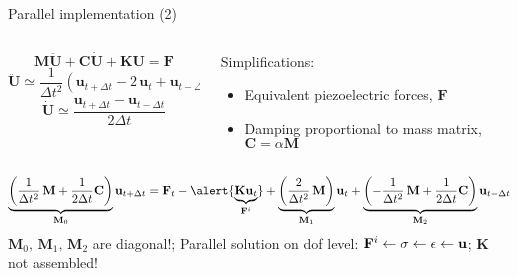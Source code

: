 \documentclass[10pt,aspectratio=169,dvipsnames]{beamer} %
\newcommand{\matr}[1]{\mathbf{#1}} %
\newcommand{\vect}[1]{\mathbf{#1}} %
\begin{document}
\begin{frame}{Parallel implementation (2)}
	\begin{columns}[T]
		\begin{column}{0.45\textwidth}
			\setlength{\abovedisplayskip}{-\baselineskip}
				\begin{fleqn}
				\begin{equation*}
					\matr{M} \vect{\ddot{U}} + \matr{C} \vect{\dot{U}} + \matr{K} \vect{U} = \vect{F} \label{eq:motion}
				\end{equation*}  
				\begin{equation*}
					\ddot{\vect{U}}\simeq \frac{1}{\Delta t^2} \left(\vect{u}_{t+\Delta t} - 2\,\vect{u}_t + \vect{u}_{t-\Delta t}\right) \label{eq:central_scheme}
				\end{equation*}
				\begin{equation*}
					\dot{\vect{U}}\simeq \frac{\vect{u}_{t+\Delta t} -\vect{u}_{t-\Delta t}}{2 \Delta t}
					\label{eq:first_derivative_scheme}
				\end{equation*}
				\end{fleqn}
		\end{column}
		\begin{column}{0.45\textwidth}	
			Simplifications:
			\begin{itemize}
				\item Equivalent piezoelectric forces, $\vect{F}$
				\item Damping proportional to mass matrix, $\matr{C}=\alpha\vect{M}$
			\end{itemize}	
		\end{column}
	\end{columns}
\begin{fleqn}
\begin{equation*}
	\underbrace{\left(\frac{1}{\Delta t^2} \,\matr{M} + \frac{1}{2 \Delta t} \matr{C}\right)}_{\vect{M}_0} \vect{u}_{t+\Delta t} = \vect{F}_t - \alert{\underbrace{\matr{K} \vect{u}_t}_{\vect{F}^i}} + \underbrace{\left(\frac{2}{\Delta t^2} \,\matr{M} \right)}_{\vect{M}_1}\vect{u}_t 
	+ \underbrace{\left(- \frac{1}{\Delta t^2} \,\matr{M} + \frac{1}{2 \Delta t} \matr{C}\right)}_{\vect{M}_2} \vect{u}_{t-\Delta t}
	\label{eq:explicit_integration}
\end{equation*}
\alert{$\vect{M}_0,\, \vect{M}_1,\, \vect{M}_2$ are diagonal!};\vspace{1mm} Parallel solution on dof level: $\vect{F}^i \leftarrow \bf{\sigma} \leftarrow \bf{\epsilon} \leftarrow \vect{u}$; \vspace{1mm}$\matr{K}$ not assembled!
\end{fleqn}	
\end{frame}
\end{document}
